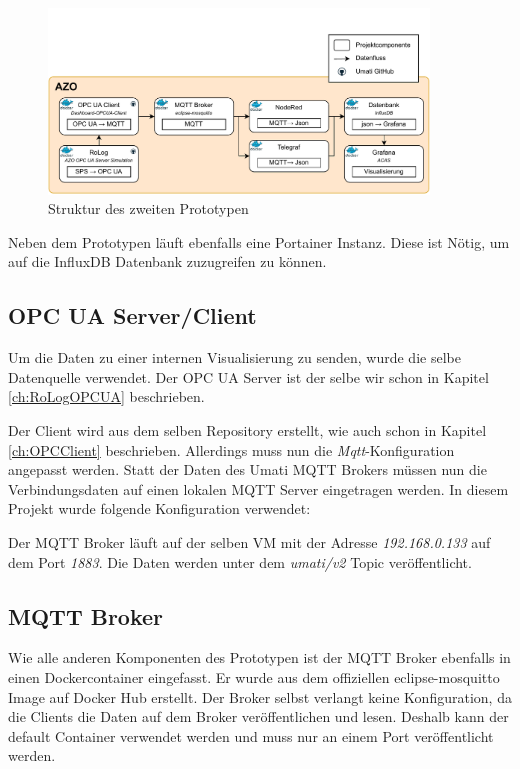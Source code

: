 \documentclass[a4paper, 12pt, oneside, toc=listofnumbered, bibliography=totoc]{scrbook}
\begin{document}
		\begin{figure}[H]
			\centering
			\includegraphics[width=0.9\textwidth]{res/implementierung/Prototyp-Prototyp.pdf}
			\caption{Struktur des zweiten Prototypen}
			\label{fig:Prototyp2}
		\end{figure}
		
		Neben dem Prototypen läuft ebenfalls eine Portainer Instanz. Diese ist Nötig, um auf die InfluxDB Datenbank zuzugreifen zu können. 
		
		\subsection{OPC UA Server/Client}
		
		Um die Daten zu einer internen Visualisierung zu senden, wurde die selbe Datenquelle verwendet. Der OPC UA Server ist der selbe wir schon in Kapitel \ref{ch:RoLogOPCUA} beschrieben. 
		
		Der Client wird aus dem selben Repository erstellt, wie auch schon in Kapitel \ref{ch:OPCClient} beschrieben. Allerdings muss nun die \textit{Mqtt}-Konfiguration angepasst werden. Statt der Daten des Umati MQTT Brokers müssen nun die Verbindungsdaten auf einen lokalen MQTT Server eingetragen werden. In diesem Projekt wurde folgende Konfiguration verwendet:
		
		
		
		Der MQTT Broker läuft auf der selben VM mit der Adresse \textit{192.168.0.133} auf dem Port \textit{1883}. Die Daten werden unter dem \textit{umati/v2} Topic veröffentlicht. 
		
		\subsection{MQTT Broker}
		
		Wie alle anderen Komponenten des Prototypen ist der MQTT Broker ebenfalls in einen Dockercontainer eingefasst. Er wurde aus dem offiziellen eclipse-mosquitto Image auf Docker Hub erstellt. Der Broker selbst verlangt keine Konfiguration, da die Clients die Daten auf dem Broker veröffentlichen und lesen. Deshalb kann der default Container verwendet werden und muss nur an einem Port veröffentlicht werden.
		
\end{document}
